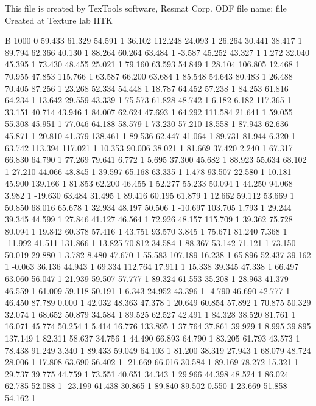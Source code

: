 This file is created by TexTools software, Resmat Corp.
ODF file name: file Created at Texture lab IITK

B 1000 0
	59.433 61.329 54.591 1
	36.102 112.248 24.093 1
	26.264 30.441 38.417 1
	89.794 62.366 40.130 1
	88.264 60.264 63.484 1
	-3.587 45.252 43.327 1
	1.272 32.040 45.395 1
	73.430 48.455 25.021 1
	79.160 63.593 54.849 1
	28.104 106.805 12.468 1
	70.955 47.853 115.766 1
	63.587 66.200 63.684 1
	85.548 54.643 80.483 1
	26.488 70.405 87.256 1
	23.268 52.334 54.448 1
	18.787 64.452 57.238 1
	84.253 61.816 64.234 1
	13.642 29.559 43.339 1
	75.573 61.828 48.742 1
	6.182 6.182 117.365 1
	33.151 40.714 43.946 1
	84.007 62.624 47.693 1
	64.292 111.584 21.641 1
	59.055 55.308 45.951 1
	77.046 64.188 58.579 1
	73.230 57.210 18.558 1
	87.943 62.636 45.871 1
	20.810 41.379 138.461 1
	89.536 62.447 41.064 1
	89.731 81.944 6.320 1
	63.742 113.394 117.021 1
	10.353 90.006 38.021 1
	81.669 37.420 2.240 1
	67.317 66.830 64.790 1
	77.269 79.641 6.772 1
	5.695 37.300 45.682 1
	88.923 55.634 68.102 1
	27.210 44.066 48.845 1
	39.597 65.168 63.335 1
	1.478 93.507 22.580 1
	10.181 45.900 139.166 1
	81.853 62.200 46.455 1
	52.277 55.233 50.094 1
	44.250 94.068 3.982 1
	-19.630 63.484 31.495 1
	89.416 60.195 61.879 1
	12.662 59.112 53.669 1
	50.850 68.016 65.678 1
	32.934 48.197 50.506 1
	-10.697 103.705 1.793 1
	29.244 39.345 44.599 1
	27.846 41.127 46.564 1
	72.926 48.157 115.709 1
	39.362 75.728 80.094 1
	19.842 60.378 57.416 1
	43.751 93.570 3.845 1
	75.671 81.240 7.368 1
	-11.992 41.511 131.866 1
	13.825 70.812 34.584 1
	88.367 53.142 71.121 1
	73.150 50.019 29.880 1
	3.782 8.480 47.670 1
	55.583 107.189 16.238 1
	65.896 52.437 39.162 1
	-0.063 36.136 44.943 1
	69.334 112.764 17.911 1
	15.338 39.345 47.338 1
	66.497 63.060 56.047 1
	21.939 59.507 57.777 1
	89.324 61.553 35.208 1
	28.963 41.379 46.559 1
	61.009 59.118 50.191 1
	6.343 24.952 43.396 1
	-4.790 46.690 42.777 1
	46.450 87.789 0.000 1
	42.032 48.363 47.378 1
	20.649 60.854 57.892 1
	70.875 50.329 32.074 1
	68.652 50.879 34.584 1
	89.525 62.527 42.491 1
	84.328 38.520 81.761 1
	16.071 45.774 50.254 1
	5.414 16.776 133.895 1
	37.764 37.861 39.929 1
	8.995 39.895 137.149 1
	82.311 58.637 34.756 1
	44.490 66.893 64.790 1
	83.205 61.793 43.573 1
	78.438 91.249 3.340 1
	89.433 59.049 64.103 1
	81.200 38.319 27.943 1
	68.079 48.724 28.006 1
	17.808 63.690 56.402 1
	-21.669 66.016 30.584 1
	89.169 78.272 15.321 1
	29.737 39.775 44.759 1
	73.551 40.651 34.343 1
	29.966 44.398 48.524 1
	86.024 62.785 52.088 1
	-23.199 61.438 30.865 1
	89.840 89.502 0.550 1
	23.669 51.858 54.162 1
